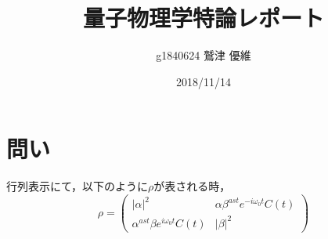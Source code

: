 \documentclass[10pt]{ujarticle}
\title{量子物理学特論レポート}
\author{g1840624 鷲津 優維}
\date{2018/11/14}
\begin{document}
\maketitle
\section{問い}
行列表示にて，以下のように$\rho$が表される時，
\[
\rho = \left(
\begin{array}{cc}
|\alpha|^2 & \alpha \beta^{ast} e^{-i\omega_0 t} C(t) \\
\alpha^{ast} \beta e^{i\omega_0 t} C(t) & |\beta|^2
\end{array}
\right)
\]
\end{document}
